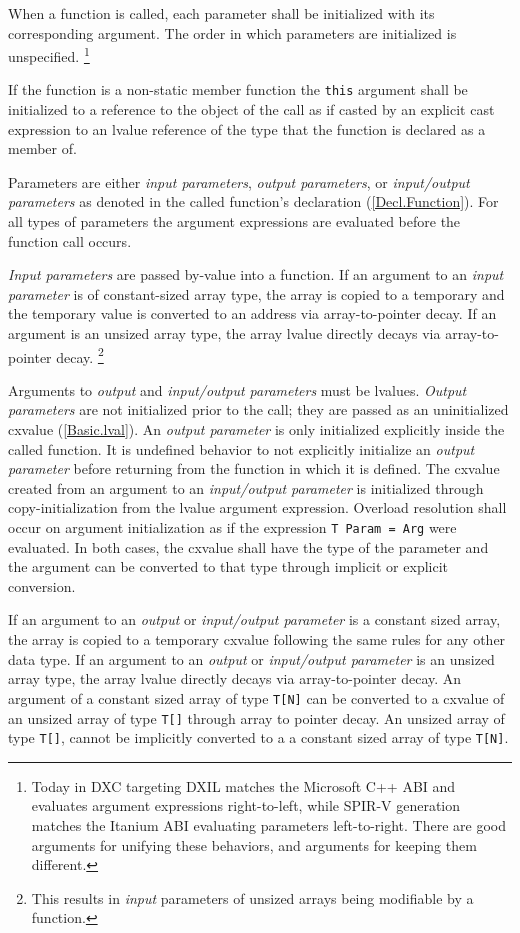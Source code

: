\p When a function is called, each parameter shall be initialized with its
corresponding argument. The order in which parameters are initialized is
unspecified. \footnote{Today in DXC targeting DXIL matches the Microsoft C++ ABI
and evaluates argument expressions right-to-left, while SPIR-V generation
matches the Itanium ABI evaluating parameters left-to-right. There are good
arguments for unifying these behaviors, and arguments for keeping them
different.}

\p If the function is a non-static member function the \texttt{this} argument
shall be initialized to a reference to the object of the call as if casted by an
explicit cast expression to an lvalue reference of the type that the function is
declared as a member of.

\p Parameters are either \textit{input parameters}, \textit{output parameters},
or \textit{input/output parameters} as denoted in the called function's
declaration (\ref{Decl.Function}). For all types of parameters the argument
expressions are evaluated before the function call occurs.

\p \textit{Input parameters} are passed by-value into a function. If an argument
to an \textit{input parameter} is of constant-sized array type, the array is
copied to a temporary and the temporary value is converted to an address via
array-to-pointer decay. If an argument is an unsized array type, the array
lvalue directly decays via array-to-pointer decay. \footnote{This results in
\textit{input} parameters of unsized arrays being modifiable by a function.}

\p Arguments to \textit{output} and \textit{input/output parameters} must be
lvalues. \textit{Output parameters} are not initialized prior to the call; they
are passed as an uninitialized cxvalue (\ref{Basic.lval}). An \textit{output
parameter} is only initialized explicitly inside the called function. It is
undefined behavior to not explicitly initialize an \textit{output parameter}
before returning from the function in which it is defined. The cxvalue created
from an argument to an \textit{input/output parameter} is initialized through
copy-initialization from the lvalue argument expression. Overload resolution
shall occur on argument initialization as if the expression \texttt{T Param =
Arg} were evaluated. In both cases, the cxvalue shall have the type of the
parameter and the argument can be converted to that type through implicit or
explicit conversion.

\p If an argument to an \textit{output} or \textit{input/output parameter} is a
constant sized array, the array is copied to a temporary cxvalue following the
same rules for any other data type. If an argument to an \textit{output} or
\textit{input/output parameter} is an unsized array type, the array lvalue
directly decays via array-to-pointer decay. An argument of a constant sized
array of type \texttt{T[N]} can be converted to a cxvalue of an unsized array
of type \texttt{T[]} through array to pointer decay. An unsized array of type
\texttt{T[]}, cannot be implicitly converted to a a constant sized array of type
\texttt{T[N]}.

